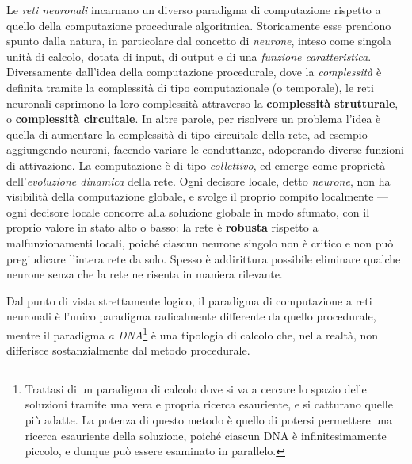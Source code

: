 \documentclass[10pt]{book}
\begin{document}
Le \emph{reti neuronali} incarnano un diverso paradigma di computazione
rispetto a quello della computazione procedurale algoritmica. Storicamente esse
prendono spunto dalla natura, in particolare dal concetto di \emph{neurone},
inteso come singola unità di calcolo, dotata di input, di output e di una
\emph{funzione caratteristica}. Diversamente dall'idea della computazione
procedurale, dove la \emph{complessità} è definita tramite la complessità di
tipo computazionale (o temporale), le reti neuronali esprimono la loro
complessità attraverso la \textbf{complessità strutturale}, o
\textbf{complessità circuitale}. In altre parole, per risolvere un problema
l'idea è quella di aumentare la complessità di tipo circuitale della rete, ad
esempio aggiungendo neuroni, facendo variare le conduttanze, adoperando diverse
funzioni di attivazione. La computazione è di tipo \emph{collettivo}, ed emerge
come proprietà dell'\emph{evoluzione dinamica} della rete. Ogni decisore
locale, detto \emph{neurone}, non ha visibilità della computazione globale, e
svolge il proprio compito localmente \---- ogni decisore locale concorre alla
soluzione globale in modo sfumato, con il proprio valore in stato alto o basso:
la rete è \textbf{robusta} rispetto a malfunzionamenti locali, poiché ciascun
neurone singolo non è critico e non può pregiudicare l'intera rete da solo.
Spesso è addirittura possibile eliminare qualche neurone senza che la rete ne
risenta in maniera rilevante.

Dal punto di vista strettamente logico, il paradigma di computazione a reti
neuronali è l'unico paradigma radicalmente differente da quello procedurale,
mentre il paradigma \emph{a DNA}\footnote{Trattasi di un
paradigma di calcolo dove si va a cercare lo spazio delle soluzioni tramite una
vera e propria ricerca esauriente, e si catturano quelle più adatte.  La
potenza di questo metodo è quello di potersi permettere una ricerca esauriente
della soluzione, poiché ciascun DNA è infinitesimamente piccolo, e dunque può
essere esaminato in parallelo.} è una tipologia di calcolo che, nella realtà,
non differisce sostanzialmente dal metodo procedurale.
\end{document}
